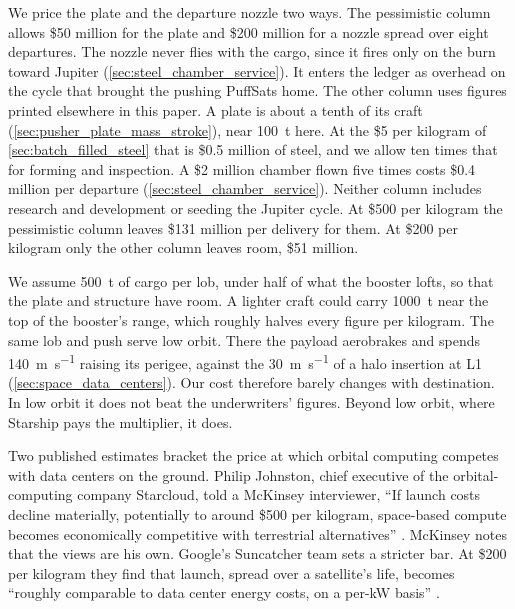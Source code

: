 \documentclass{article}
\begin{document}
We price the plate and the departure nozzle two ways. The pessimistic column allows \$50 million for the plate and \$200 million for a nozzle spread over eight departures. The nozzle never flies with the cargo, since it fires only on the burn toward Jupiter (\autoref{sec:steel_chamber_service}). It enters the ledger as overhead on the cycle that brought the pushing PuffSats home. The other column uses figures printed elsewhere in this paper. A plate is about a tenth of its craft (\autoref{sec:pusher_plate_mass_stroke}), near \SI{100}{\tonne} here. At the \$5 per kilogram of \autoref{sec:batch_filled_steel} that is \$0.5 million of steel, and we allow ten times that for forming and inspection. A \$2 million chamber flown five times costs \$0.4 million per departure (\autoref{sec:steel_chamber_service}). Neither column includes research and development or seeding the Jupiter cycle. At \$500 per kilogram the pessimistic column leaves \$131 million per delivery for them. At \$200 per kilogram only the other column leaves room, \$51 million.

We assume \SI{500}{\tonne} of cargo per lob, under half of what the booster lofts, so that the plate and structure have room. A lighter craft could carry \SI{1000}{\tonne} near the top of the booster's range, which roughly halves every figure per kilogram. The same lob and push serve low orbit. There the payload aerobrakes and spends \SI{140}{\meter\per\second} raising its perigee, against the \SI{30}{\meter\per\second} of a halo insertion at L1 (\autoref{sec:space_data_centers}). Our cost therefore barely changes with destination. In low orbit it does not beat the underwriters' figures. Beyond low orbit, where Starship pays the multiplier, it does.

Two published estimates bracket the price at which orbital computing competes with data centers on the ground. Philip Johnston, chief executive of the orbital-computing company Starcloud, told a McKinsey interviewer, ``If launch costs decline materially, potentially to around \$500 per kilogram, space-based compute becomes economically competitive with terrestrial alternatives'' \cite{bennici2026_johnston}. McKinsey notes that the views are his own. Google's Suncatcher team sets a stricter bar. At \$200 per kilogram they find that launch, spread over a satellite's life, becomes ``roughly comparable to data center energy costs, on a per-kW basis'' \cite{aguera2026_suncatcher}.
\end{document}
